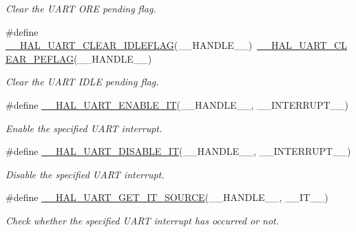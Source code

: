 \begin{DoxyCompactItemize}
\begin{DoxyCompactList}\small\item\em Clear the U\-A\-R\-T O\-R\-E pending flag. \end{DoxyCompactList}\item 
\#define \hyperlink{group___u_a_r_t___exported___macros_ga1345aa0af53d82269b13835c225e91d0}{\-\_\-\-\_\-\-H\-A\-L\-\_\-\-U\-A\-R\-T\-\_\-\-C\-L\-E\-A\-R\-\_\-\-I\-D\-L\-E\-F\-L\-A\-G}(\-\_\-\-\_\-\-H\-A\-N\-D\-L\-E\-\_\-\-\_\-)~\hyperlink{group___u_a_r_t___exported___macros_gaba5e19c60e0f37341b1585a380b84d49}{\-\_\-\-\_\-\-H\-A\-L\-\_\-\-U\-A\-R\-T\-\_\-\-C\-L\-E\-A\-R\-\_\-\-P\-E\-F\-L\-A\-G}(\-\_\-\-\_\-\-H\-A\-N\-D\-L\-E\-\_\-\-\_\-)
\begin{DoxyCompactList}\small\item\em Clear the U\-A\-R\-T I\-D\-L\-E pending flag. \end{DoxyCompactList}\item 
\#define \hyperlink{group___u_a_r_t___exported___macros_gaba94165ed584d49c1ec12df9819bd4bb}{\-\_\-\-\_\-\-H\-A\-L\-\_\-\-U\-A\-R\-T\-\_\-\-E\-N\-A\-B\-L\-E\-\_\-\-I\-T}(\-\_\-\-\_\-\-H\-A\-N\-D\-L\-E\-\_\-\-\_\-, \-\_\-\-\_\-\-I\-N\-T\-E\-R\-R\-U\-P\-T\-\_\-\-\_\-)
\begin{DoxyCompactList}\small\item\em Enable the specified U\-A\-R\-T interrupt. \end{DoxyCompactList}\item 
\#define \hyperlink{group___u_a_r_t___exported___macros_ga3c29b33f38658acbf592e9aaf84c6f33}{\-\_\-\-\_\-\-H\-A\-L\-\_\-\-U\-A\-R\-T\-\_\-\-D\-I\-S\-A\-B\-L\-E\-\_\-\-I\-T}(\-\_\-\-\_\-\-H\-A\-N\-D\-L\-E\-\_\-\-\_\-, \-\_\-\-\_\-\-I\-N\-T\-E\-R\-R\-U\-P\-T\-\_\-\-\_\-)
\begin{DoxyCompactList}\small\item\em Disable the specified U\-A\-R\-T interrupt. \end{DoxyCompactList}\item 
\#define \hyperlink{group___u_a_r_t___exported___macros_gab7ad503802bf56bf397c392fc8e18b77}{\-\_\-\-\_\-\-H\-A\-L\-\_\-\-U\-A\-R\-T\-\_\-\-G\-E\-T\-\_\-\-I\-T\-\_\-\-S\-O\-U\-R\-C\-E}(\-\_\-\-\_\-\-H\-A\-N\-D\-L\-E\-\_\-\-\_\-, \-\_\-\-\_\-\-I\-T\-\_\-\-\_\-)
\begin{DoxyCompactList}\small\item\em Check whether the specified U\-A\-R\-T interrupt has occurred or not. \end{DoxyCompactList}\item 

\end{DoxyCompactItemize}
